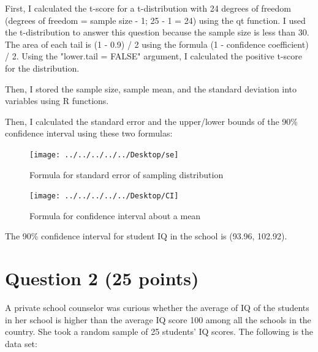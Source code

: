 \documentclass[12pt,letterpaper]{article}
\begin{document}
\noindent First, I calculated the t-score for a t-distribution with 24 degrees of freedom (degrees of freedom = sample size - 1; 25 - 1 = 24) using the qt function.  I used the t-distribution to answer this question because the sample size is less than 30. The area of each tail is (1 - 0.9) / 2 using the formula (1 - confidence coefficient) / 2. Using the "lower.tail = FALSE" argument, I calculated the positive t-score for the distribution.

  

\vspace{0.5cm}
\noindent Then, I stored the sample size, sample mean, and the standard deviation into variables using R functions.

  

\vspace{0.5cm}
\noindent Then, I calculated the standard error and the upper/lower bounds of the 90\% confidence interval using these two formulas:

\begin{figure} [h]
	\centering
	\texttt{[image: ../../../../../Desktop/se]}
	\caption{Formula for standard error of sampling distribution}
	\label{fig:se}
\end{figure}


\begin{figure} [h]
	\centering
	\texttt{[image: ../../../../../Desktop/CI]}
	\caption{Formula for confidence interval about a mean}
	\label{fig:ci}
\end{figure}


  

\vspace{0.5cm}
\noindent The 90\% confidence interval for student IQ in the school is (93.96, 102.92).
\vspace{1cm}

\section*{Question 2 (25 points)}
A private school counselor was curious whether the average of IQ of the students in her school is higher than the average IQ score 100 among all the schools in the country. She took a random sample of 25 students' IQ scores. The following is the data set:
\vspace{.5cm}
  
\vspace{.5cm}
\end{document}
